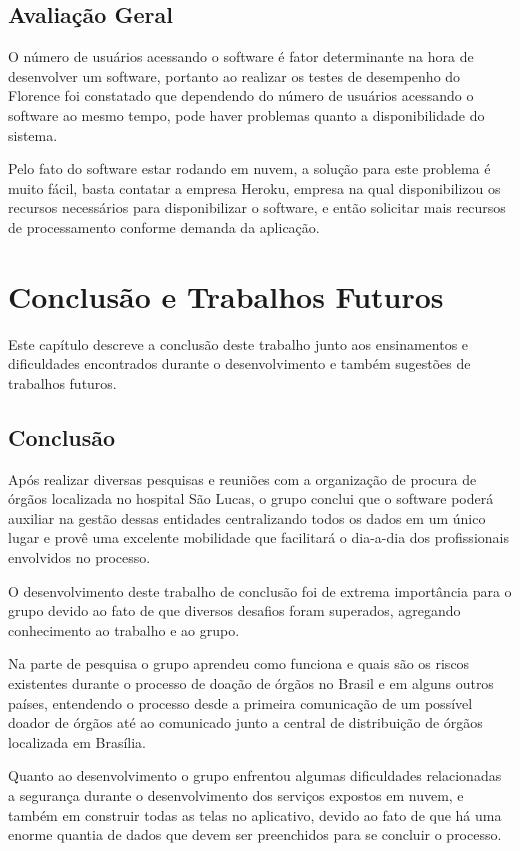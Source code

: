 \documentclass[portuguese,oneside]{tcc}
\begin{document}
\section{Avaliação Geral}
O número de usuários acessando o software é fator determinante na hora de desenvolver um software, portanto ao realizar os testes de desempenho do Florence foi constatado que dependendo do número de usuários acessando o software ao mesmo tempo, pode haver problemas quanto a disponibilidade do sistema.

Pelo fato do software estar rodando em nuvem, a solução para este problema é muito fácil, basta contatar a empresa Heroku, empresa na qual disponibilizou os recursos necessários para disponibilizar o software, e então solicitar mais recursos de processamento conforme demanda da aplicação.

\chapter{Conclusão e Trabalhos Futuros}
Este capítulo descreve a conclusão deste trabalho junto aos ensinamentos e dificuldades encontrados durante o desenvolvimento e também sugestões de trabalhos futuros.

\section{Conclusão}
Após realizar diversas pesquisas e reuniões com a organização de procura de órgãos localizada no hospital São Lucas, o grupo conclui que o software poderá auxiliar na gestão dessas entidades centralizando todos os dados em um  único lugar e provê uma excelente mobilidade que facilitará o dia-a-dia dos profissionais envolvidos no processo.

O desenvolvimento deste trabalho de conclusão foi de extrema importância para o grupo devido ao fato de que diversos desafios foram superados, agregando conhecimento ao trabalho e ao grupo.

Na parte de pesquisa o grupo aprendeu como funciona e quais são os riscos existentes durante o processo de doação de órgãos no Brasil e em alguns outros países, entendendo o processo desde a primeira comunicação de um possível doador de órgãos até ao comunicado junto a central de distribuição de órgãos localizada em Brasília.

Quanto ao desenvolvimento o grupo enfrentou algumas dificuldades relacionadas a segurança durante o desenvolvimento dos serviços expostos em nuvem, e também em construir todas as telas no aplicativo, devido ao fato de que há uma enorme quantia de dados que devem ser preenchidos para se concluir o processo.
\end{document}
